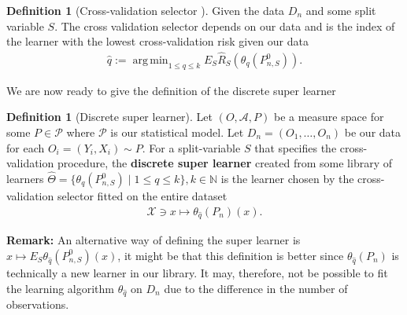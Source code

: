 \documentclass[11pt, a4paper]{article}
\DeclareMathOperator*{\argmin}{arg\,min}
\theoremstyle{definition}
\newtheorem{definition}[theorem]{Definition}
\theoremstyle{remark}
\newcommand{\q}{q}
\newcommand{\ml}{k}
\newcommand{\btheta}{\theta}
\begin{document}
\begin{definition}[Cross-validation selector \cite{laan03}]
    Given the data $ D_n $ and some split variable $ S $. The cross validation selector depends on our data and is the index of the learner with the lowest cross-validation risk given our data 
    \begin{align*}
        \hat{\q} := \argmin_{1 \leq \q \leq k} E_S \hat{R}_S ( \btheta _\q (P_{n,S}^0 )). 
    \end{align*}
\end{definition}
%
We are now ready to give the definition of the discrete super learner
\begin{definition}[Discrete super learner]
    Let $ (O, \mathcal{A}, P)  $ be a measure space for some $ P \in \mathcal{P} $ where $ \mathcal{P} $ is our statistical model. Let $ D_n = (O_1 , \dots , O_n) $ be our data for each $ O_i = (Y_i , X_i) \sim P $. For a split-variable $ S $ that specifies the cross-validation procedure, the \textbf{discrete super learner} created from some library of learners $ \hat{\Theta} = \{ \btheta_{\q}(P_{n, S}^{0}) \mid 1 \leq \q \leq \ml \}, \ml \in \mathbb{N} $ is the learner chosen by the cross-validation selector fitted on the entire dataset
    \begin{align*}
        \mathcal{X} \ni x \mapsto \theta_{\hat{\q}}(P_n)(x). 
    \end{align*}
\end{definition}
\textbf{Remark:} An alternative way of defining the super learner is $ x \mapsto E_S \theta_{ \hat{\q} }(P_{n,S}^{0})(x) $, it might be that this definition is better since $ \theta_{ \hat{\q} }(P_n) $ is technically a new learner in our library. It may, therefore, not be possible to fit the learning algorithm $ \theta_{\hat{\q}}$ on $ D_n $ due to the difference in the number of observations.
\end{document}
